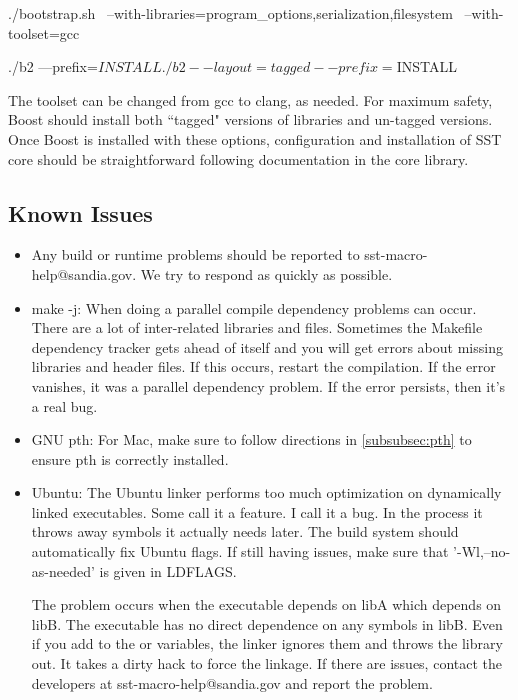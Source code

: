 \begin{ViFile}
./bootstrap.sh \
  --with-libraries=program_options,serialization,filesystem \
  --with-toolset=gcc

./b2 ---prefix=$INSTALL
./b2 --layout=tagged --prefix=$INSTALL
\end{ViFile}

The toolset can be changed from gcc to clang, as needed.  For maximum safety, Boost should install both ``tagged" versions of libraries and un-tagged versions.  Once Boost is installed with these options, configuration and installation of SST core should be straightforward following documentation in the core library.

\subsection{Known Issues}
\label{subsec:build:issues}


\begin{itemize}
\item Any build or runtime problems should be reported to sst-macro-help@sandia.gov.  We try to respond as quickly as possible.
\item make -j: When doing a parallel compile dependency problems can occur.  
There are a lot of inter-related libraries and files.  
Sometimes the Makefile dependency tracker gets ahead of itself and you will get errors about missing libraries and header files.
If this occurs, restart the compilation.  If the error vanishes, it was a parallel dependency problem.
If the error persists, then it's a real bug.
\item GNU pth: For Mac, make sure to follow directions in \ref{subsubsec:pth} to ensure pth is correctly installed.
\item Ubuntu: The Ubuntu linker performs too much optimization on dynamically linked executables.
Some call it a feature.  I call it a bug.
In the process it throws away symbols it actually needs later. The build system should automatically fix Ubuntu flags.
If still having issues, make sure that '-Wl,--no-as-needed' is given in LDFLAGS.

The problem occurs when the executable depends on libA which depends on libB.
The executable has no direct dependence on any symbols in libB.
Even if you add \inlineshell{-lB} to the \inlineshell{LDFLAGS} or  variables,
the linker ignores them and throws the library out.
It takes a dirty hack to force the linkage.
If there are issues, contact the developers at sst-macro-help@sandia.gov and report the problem. 
\end{itemize}


